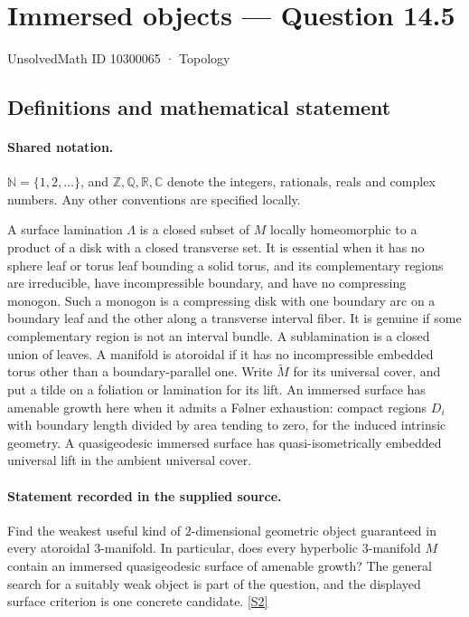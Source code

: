 \documentclass[11pt]{article}
\newcommand{\sref}[2]{\hyperlink{source:#1:#2}{[S#2]}}
\begin{document}
\setcounter{section}{10300064}
\section{Immersed objects — Question 14.5}\label{10300065}
{\small\sffamily UnsolvedMath ID 10300065 · Topology}
\subsection{Definitions and mathematical statement}

\paragraph{Shared notation.}$\mathbb N=\{1,2,\ldots\}$, and $\mathbb Z,\mathbb Q,\mathbb R,\mathbb C$ denote the integers, rationals, reals and complex numbers. Any other conventions are specified locally.


A surface lamination $\Lambda$ is a closed subset of $M$ locally homeomorphic to a product of a disk with a closed transverse set. It is essential when it has no sphere leaf or torus leaf bounding a solid torus, and its complementary regions are irreducible, have incompressible boundary, and have no compressing monogon. Such a monogon is a compressing disk with one boundary arc on a boundary leaf and the other along a transverse interval fiber. It is genuine if some complementary region is not an interval bundle. A sublamination is a closed union of leaves. A manifold is atoroidal if it has no incompressible embedded torus other than a boundary-parallel one. Write $\widetilde M$ for its universal cover, and put a tilde on a foliation or lamination for its lift. An immersed surface has amenable growth here when it admits a F\o lner exhaustion: compact regions $D_i$ with boundary length divided by area tending to zero, for the induced intrinsic geometry. A quasigeodesic immersed surface has quasi-isometrically embedded universal lift in the ambient universal cover.
\paragraph{Statement recorded in the supplied source.}
Find the weakest useful kind of $2$-dimensional geometric object guaranteed in every atoroidal $3$-manifold. In particular, does every hyperbolic $3$-manifold $M$ contain an immersed quasigeodesic surface of amenable growth? The general search for a suitably weak object is part of the question, and the displayed surface criterion is one concrete candidate. \sref{10300065}{2}
\end{document}
